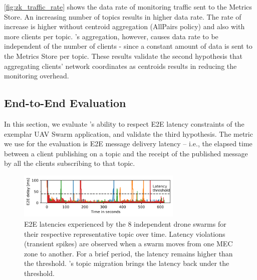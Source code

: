 \cref{fig:zk_traffic_rate} shows the data rate of monitoring traffic sent to the Metrics Store. An increasing number of topics results in higher data rate. The rate of increase is higher without centroid aggregation (AllPairs policy) and also with more clients per topic. \epulsar's aggregation, however, causes data rate to be independent of the number of clients - since a constant amount of data is sent to the Metrics Store per topic. These results validate the second hypothesis that aggregating clients' network coordinates as centroids results in reducing the monitoring overhead.

\subsection{End-to-End Evaluation}
In this section, we evaluate \epulsar's ability to respect E2E latency constraints of the exemplar UAV Swarm application, and validate the third hypothesis. The metric we use for the evaluation is E2E message delivery latency -- i.e., the elapsed time between a client publishing on a topic and the receipt of the published message by all the clients subscribing to that topic.

\begin{figure}[!t]
    \centering
    \includegraphics[width=0.7\textwidth]{figures/epulsar/evals/e2e_delays_swarm_combined.pdf}
    \caption{E2E latencies experienced by the 8 independent drone swarms for their respective representative topic over time. Latency violations (transient spikes) are observed when a swarm moves from one MEC zone to another.  For a brief period, the latency remains higher than the threshold. \epulsar's topic migration brings the latency back under the threshold.}
    \label{fig:e2e_drone_swarm_aggr}
\end{figure}

